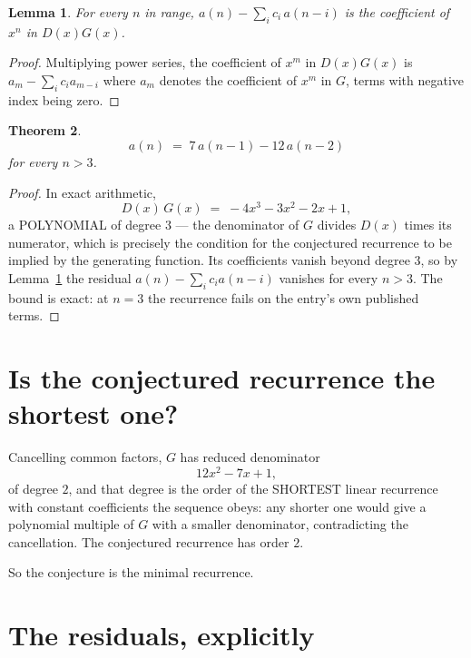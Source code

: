 \documentclass[11pt,a4paper]{article}
\theoremstyle{plain}
\newtheorem{theorem}{Theorem}
\newtheorem{lemma}[theorem]{Lemma}
\theoremstyle{definition}
\begin{document}
\begin{lemma}\label{lem:key}
For every $n$ in range, $a(n)-\sum_i c_i\,a(n-i)$ is the coefficient of $x^{n}$ in
$D(x)G(x)$.
\end{lemma}

\begin{proof}
Multiplying power series, the coefficient of $x^{m}$ in $D(x)G(x)$ is
$a_m-\sum_i c_i a_{m-i}$ where $a_m$ denotes the coefficient of $x^{m}$ in $G$, terms with
negative index being zero.
\end{proof}

\begin{theorem}
\[
a(n)\;=\;7\,a(n-1) - 12\,a(n-2)
\]
for every $n>3$.
\end{theorem}

\begin{proof}
In exact arithmetic,
\[
D(x)\,G(x)\;=\;- 4 x^{3} - 3 x^{2} - 2 x + 1,
\]
a POLYNOMIAL of degree $3$ --- the denominator of $G$ divides $D(x)$ times its numerator,
which is precisely the condition for the conjectured recurrence to be implied by the
generating function. Its coefficients vanish beyond degree $3$, so by
Lemma~\ref{lem:key} the residual $a(n)-\sum_ic_ia(n-i)$ vanishes for every
$n>3$. The bound is exact: at $n=3$ the recurrence fails on the entry's own published terms.
\end{proof}

\section{Is the conjectured recurrence the shortest one?}

Cancelling common factors, $G$ has reduced denominator
\[
12 x^{2} - 7 x + 1,
\]
of degree $2$, and that degree is the order of the SHORTEST linear recurrence with
constant coefficients the sequence obeys: any shorter one would give a polynomial multiple of
$G$ with a smaller denominator, contradicting the cancellation. The conjectured recurrence has
order $2$.

So the conjecture is the minimal recurrence.

\section{The residuals, explicitly}
\end{document}
